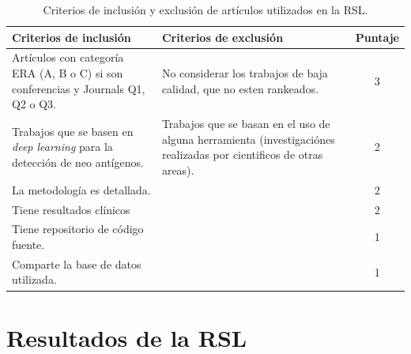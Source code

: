 \begin{table}[H]
	\begin{center}
		\caption{Criterios de inclusión y exclusión de artículos utilizados en la RSL.}
		\label{tab:criterios}
		\setlength{\tabcolsep}{0.5em} %
		{\renewcommand{\arraystretch}{1.2}%
			\begin{tabular}{p{5.5cm}p{5.5cm}c}
				\textbf{Criterios de inclusión}                                                   & \textbf{Criterios de exclusión}                                                          & \textbf{Puntaje} \\ \hline
				Artículos con categoría ERA (A, B o C) si son conferencias y Journals Q1, Q2 o Q3. & No considerar los trabajos de baja calidad, que no esten rankeados.                       & 3                \\
				Trabajos que se basen en \textit{deep learning} para la detección de neo antígenos.          & Trabajos que se basan en el uso de alguna herramienta (investigaciónes realizadas por cientificos de otras areas). & 2                \\
				La metodología es detallada.                                                       &                                                                                          & 2                \\
				Tiene resultados clínicos                                                         &                                                                                          & 2                \\
				Tiene repositorio de código fuente.                                          &                                                                                          & 1                \\
				Comparte la base de datos utilizada.                                         &                                                                                          & 1               
			\end{tabular}
		}
	\end{center}
\end{table}





\section{Resultados de la RSL}\index{} 
\label{sec:neoantigen}


